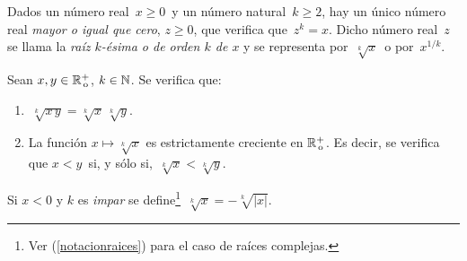 Dados un número real $\,x\ge0\,$ y un número natural $\,k\geqslant2$,
hay un único número real \emph{mayor o igual que cero}, $z\ge0$,
que verifica que $\,z^{k}=x$. Dicho número real $\,z\,$ se llama
la \emph{raíz $k$-ésima o de orden $k$ de $x$} y se representa
por $\,\sqrt[k]{x}\,$ o por $\,x^{1/k}$. \begin{proposicion}{}{}
Sean $x,y\in{\mathbb R}^{+}_{\,\rm o}$, $k\in\mathbb N$. Se verifica que: 
\begin{enumerate}
\item $\ \sqrt[k]{x\,y}=\sqrt[k]{x}\,\sqrt[k]{y}$. 
\item La función $x\mapsto\sqrt[k]{x}$ es estrictamente creciente en ${\mathbb R}^{+}_{\,\rm o}$.
Es decir, se verifica que $x<y\,$ si, y sólo si, $\,\sqrt[k]{x}<\sqrt[k]{y}$. 
\end{enumerate}
\end{proposicion} Si $x<0$ y $k$ es \emph{impar} se define\footnote{Ver (\ref{notacionraices}) para el caso de raíces complejas.}
$\,\sqrt[k]{x}=-\sqrt[k]{|x|}$.
